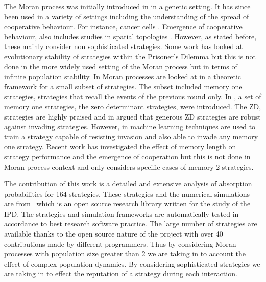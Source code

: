 \documentclass{article}
\begin{document}
The Moran process was initially introduced in \cite{Moran1957} in a genetic
setting. It has since been used in a variety of settings including the
understanding of the spread of cooperative behaviour. For instance, cancer 
cells \cite{West2016}. Emergence of cooperative behaviour, also includes 
studies in spatial topologies \cite{Nowak2017}. However, as stated before, 
these mainly consider non sophisticated strategies. Some work has looked at
evolutionary stability of strategies within the Prisoner's Dilemma \cite{Li2014}
but this is not done in the more widely used setting of the Moran process but in
terms of infinite population stability. In \cite{Baek2016} Moran processes are
looked at in a theoretic framework for a small subset of strategies. 
The subset included memory one strategies, strategies that recall the events 
of the previous round only. In \cite{Press2012}, a set of memory one 
strategies, the zero determinant strategies, were introduced. The ZD\@,
strategies are highly praised and in \cite{Stewart26062012} argued that 
generous ZD strategies are robust against invading strategies. However,
in \cite{Lee2015} machine learning techniques are used to train a strategy 
capable of resisting invasion and also able to invade any memory one strategy. 
Recent work \cite{Hilbe2017} has investigated the effect of memory length on 
strategy performance and the emergence of cooperation but this is not done in 
Moran process context and only considers specific cases of memory 2 strategies.

The contribution of this work is a detailed and extensive analysis of absorption
probabilities for 164 strategies. These strategies and the numerical simulations
are from~\cite{axelrodproject} which is an open source research library written
for the study of the IPD\@. The strategies and simulation frameworks are
automatically tested in accordance to best research software practice. The large
number of strategies are available thanks to the open source nature of the
project with over 40 contributions made by different programmers. Thus by
considering Moran processes with population size greater than 2 we are taking in
to account the effect of complex population dynamics. By considering
sophisticated strategies we are taking in to effect the reputation of a strategy
during each interaction.
\end{document}
